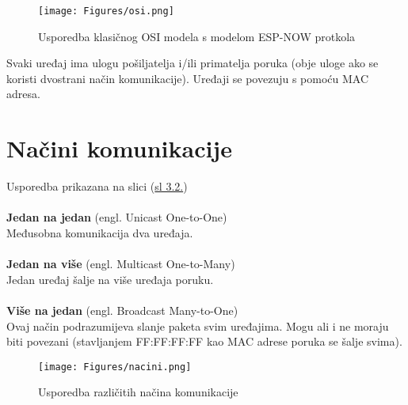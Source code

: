 \documentclass[seminarskirad]{fer}
\begin{document}
\begin{figure}[h!]
  \centering
  \texttt{[image: Figures/osi.png]} 
  \caption{Usporedba klasičnog OSI modela s modelom ESP-NOW protkola}
  \label{slk:usporedbaosi}
\end{figure}

Svaki uređaj ima ulogu pošiljatelja i/ili primatelja poruka (obje uloge ako se koristi dvostrani način komunikacije). Uređaji se povezuju s pomoću MAC adresa. 

\section{Načini komunikacije}

Usporedba prikazana na slici (\hyperref[slk:drugaslika]{sl 3.2.})
\\ \\
\textbf{Jedan na jedan} (engl. Unicast One-to-One) \\
Međusobna komunikacija dva uređaja. \\ \\
\textbf{Jedan na više} (engl. Multicast One-to-Many) \\
Jedan uređaj šalje na više uređaja poruku. \\ \\
\textbf{Više na jedan} (engl. Broadcast Many-to-One) \\
Ovaj način podrazumijeva slanje paketa svim uređajima. Mogu ali i ne moraju biti povezani (stavljanjem FF:FF:FF:FF kao MAC adrese poruka se šalje svima).

\begin{figure}[h!]
  \centering
  \texttt{[image: Figures/nacini.png]} 
  \caption{Usporedba različitih načina komunikacije}
  \label{slk:drugaslika}
\end{figure}


\end{document}

